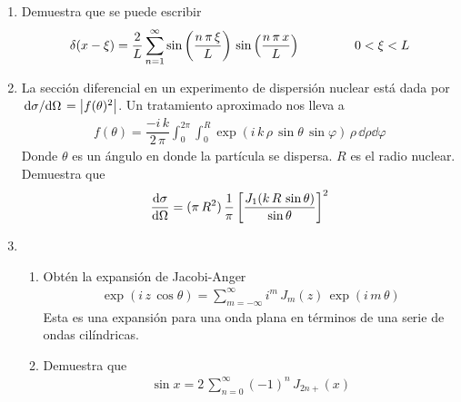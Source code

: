 \begin{enumerate}
\begin{enumerate}
\end{enumerate}
\item Demuestra que se puede escribir
\[ \delta (x - \xi) = \dfrac{2}{L} \sum_{n=1}^{\infty} \sin \left( \dfrac{n \, \pi \, \xi}{L} \right) \, \sin \left( \dfrac{n \, \pi \, x}{L} \right) \hspace{1.5cm} 0 < \xi < L  \]
\item La sección diferencial en un experimento de dispersión nuclear está dada por $\dv*{\sigma}{\Omega} = \abs{f(\theta)^{2}}$. Un tratamiento aproximado nos lleva a
\begin{align*}
f(\theta) = \dfrac{- i \, k}{2 \, \pi} \int_{0}^{2 \pi} \int_{0}^{R} \exp(i \, k \, \rho \, \sin \theta \, \sin \varphi ) \,  \rho \, \dd{\rho} \dd{\varphi}
\end{align*}
Donde $\theta$ es un ángulo en donde la partícula se dispersa. $R$ es el radio nuclear. Demuestra que
\begin{align*}
\dv{\sigma}{\Omega} = (\pi \, R^{2}) \, \dfrac{1}{\pi} \left[ \dfrac{J_{1} (k \, R \, \sin \theta)}{\sin \theta} \right]^{2}
\end{align*}
\item 
\begin{enumerate}
\item Obtén la expansión de Jacobi-Anger
\begin{align*}
\exp(i \, z \, \cos \theta) = \sum_{m=-\infty}^{\infty} i^{m} \, J_{m}(z) \, \exp(i \, m \, \theta)
\end{align*}
Esta es una expansión para una onda plana en términos de una serie de ondas cilíndricas.
\item Demuestra que
\begin{align*}
\sin x = 2 \, \sum_{n=0}^{\infty} (-1)^{n} \, J_{2n+} (x)
\end{align*}
\end{enumerate}
\end{enumerate}

